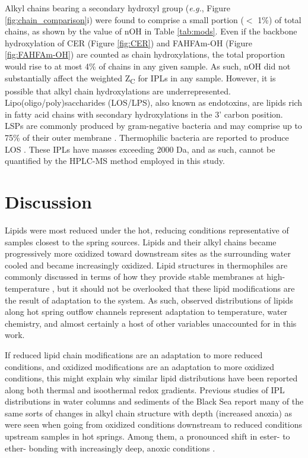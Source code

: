 Alkyl chains bearing a secondary hydroxyl group (\textit{e.g.}, Figure \ref{fig:chain_comparison}i) were found to comprise a small portion ($<$ 1\%) of total chains, as shown by the value of nOH in Table \ref{tab:mods}. Even if the backbone hydroxylation of CER (Figure \ref{fig:CER}) and FAHFAm-OH (Figure \ref{fig:FAHFAm-OH}) are counted as chain hydroxylations, the total proportion would rise to at most 4\% of chains in any given sample. As such, nOH did not substantially affect the weighted Z\textsubscript{C} for IPLs in any sample. However, it is possible that alkyl chain hydroxylations are underrepresented. Lipo(oligo/poly)saccharides (LOS/LPS), also known as endotoxins, are lipids rich in fatty acid chains with secondary hydroxylations in the 3' carbon position. LSPs are commonly produced by gram-negative bacteria and may comprise up to 75\% of their outer membrane \citep{silipo2010lipopolysaccharides}. Thermophilic bacteria are reported to produce LOS \citep{di2014thermophiles}. These IPLs have masses exceeding 2000 Da, and as such, cannot be quantified by the HPLC-MS method employed in this study.




\section{Discussion}

Lipids were most reduced under the hot, reducing conditions representative of samples closest to the spring sources. Lipids and their alkyl chains became progressively more oxidized toward downstream sites as the surrounding water cooled and became increasingly oxidized. Lipid structures in thermophiles are commonly discussed in terms of how they provide stable membranes at high-temperature \citep{daniel2000biomolecular}, but it should not be overlooked that these lipid modifications are the result of adaptation to the system. As such, observed distributions of lipids along hot spring outflow channels represent adaptation to temperature, water chemistry, and almost certainly a host of other variables unaccounted for in this work.

If reduced lipid chain modifications are an adaptation to more reduced conditions, and oxidized modifications are an adaptation to more oxidized conditions, this might explain why similar lipid distributions have been reported along both thermal and isoothermal redox gradients. Previous studies of IPL distributions in water columns and sediments of the Black Sea report many of the same sorts of changes in alkyl chain structure with depth (increased anoxia) as were seen when going from oxidized conditions downstream to reduced conditions upstream samples in hot springs. Among them, a pronounced shift in ester- to ether- bonding with increasingly deep, anoxic conditions \citep{schroder2015intact, schubotz2009detection}.

